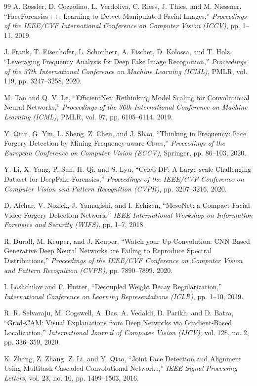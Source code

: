 \documentclass[12pt,a4paper]{report}
\begin{document}
\begin{thebibliography}{99}
A. Rossler, D. Cozzolino, L. Verdoliva, C. Riess, J. Thies, and M. Niessner, ``FaceForensics++: Learning to Detect Manipulated Facial Images,'' \textit{Proceedings of the IEEE/CVF International Conference on Computer Vision (ICCV)}, pp. 1--11, 2019.

J. Frank, T. Eisenhofer, L. Schonherr, A. Fischer, D. Kolossa, and T. Holz, ``Leveraging Frequency Analysis for Deep Fake Image Recognition,'' \textit{Proceedings of the 37th International Conference on Machine Learning (ICML)}, PMLR, vol. 119, pp. 3247--3258, 2020.

M. Tan and Q. V. Le, ``EfficientNet: Rethinking Model Scaling for Convolutional Neural Networks,'' \textit{Proceedings of the 36th International Conference on Machine Learning (ICML)}, PMLR, vol. 97, pp. 6105--6114, 2019.

Y. Qian, G. Yin, L. Sheng, Z. Chen, and J. Shao, ``Thinking in Frequency: Face Forgery Detection by Mining Frequency-aware Clues,'' \textit{Proceedings of the European Conference on Computer Vision (ECCV)}, Springer, pp. 86--103, 2020.

Y. Li, X. Yang, P. Sun, H. Qi, and S. Lyu, ``Celeb-DF: A Large-scale Challenging Dataset for DeepFake Forensics,'' \textit{Proceedings of the IEEE/CVF Conference on Computer Vision and Pattern Recognition (CVPR)}, pp. 3207--3216, 2020.

D. Afchar, V. Nozick, J. Yamagishi, and I. Echizen, ``MesoNet: a Compact Facial Video Forgery Detection Network,'' \textit{IEEE International Workshop on Information Forensics and Security (WIFS)}, pp. 1--7, 2018.

R. Durall, M. Keuper, and J. Keuper, ``Watch your Up-Convolution: CNN Based Generative Deep Neural Networks are Failing to Reproduce Spectral Distributions,'' \textit{Proceedings of the IEEE/CVF Conference on Computer Vision and Pattern Recognition (CVPR)}, pp. 7890--7899, 2020.

I. Loshchilov and F. Hutter, ``Decoupled Weight Decay Regularization,'' \textit{International Conference on Learning Representations (ICLR)}, pp. 1--10, 2019.

R. R. Selvaraju, M. Cogswell, A. Das, A. Vedaldi, D. Parikh, and D. Batra, ``Grad-CAM: Visual Explanations from Deep Networks via Gradient-Based Localization,'' \textit{International Journal of Computer Vision (IJCV)}, vol. 128, no. 2, pp. 336--359, 2020.

K. Zhang, Z. Zhang, Z. Li, and Y. Qiao, ``Joint Face Detection and Alignment Using Multitask Cascaded Convolutional Networks,'' \textit{IEEE Signal Processing Letters}, vol. 23, no. 10, pp. 1499--1503, 2016.
\end{thebibliography}
\end{document}
